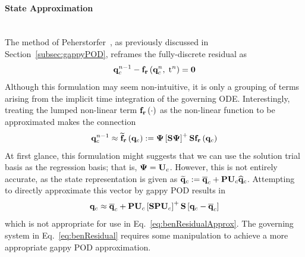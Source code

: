 \paragraph*{State Approximation}\mbox{}\\
%
The method of Peherstorfer~\cite{Peherstorfer2020Adaptive}, as previously discussed in Section~\ref{subsec:gappyPOD}, reframes the fully-discrete residual as
%
\begin{equation}\label{eq:benResidualTwo}
	\mathbf{q}_{c}^{n-1} - \mathbf{f}_{\mathbf{r}}\left(\mathbf{q}_{c}^{n},\; \text{t}^{n}\right) = \mathbf{0}
\end{equation}
%
Although this formulation may seem non-intuitive, it is only a grouping of terms arising from the implicit time integration of the governing ODE. Interestingly, treating the lumped non-linear term $\mathbf{f}_{\mathbf{r}}\left(\cdot\right)$ as the non-linear function to be approximated makes the connection
%
\begin{equation}\label{eq:benResidualApprox}
	\consVec^{\timeIdx-1} \approx \rhsResApproxFunc{\consVec} \defEq \deimBasis \left[\sampMat \deimBasis \right]^+ \sampMat \rhsResFunc{\consVec}
\end{equation}
%
At first glance, this formulation might suggests that we can use the solution trial basis as the regression basis; that is, $\deimBasis = \consTrial$. However, this is not entirely accurate, as the state representation is given as $\consVecRom \defEq \consVecCent + \consScale \consTrial \consVecCoef$. Attempting to directly approximate this vector by gappy POD results in
%
\begin{equation}\label{eq:stateGPODWrong}
	\consVec \approx \consVecCent + \consScale \consTrial \left[\sampMat \consScale \consTrial\right]^+ \sampMat \left[\consVec - \consVecCent\right]
\end{equation}
%
which is not appropriate for use in Eq.~\ref{eq:benResidualApprox}. The governing system in Eq.~\ref{eq:benResidual} requires some manipulation to achieve a more appropriate gappy POD approximation.

